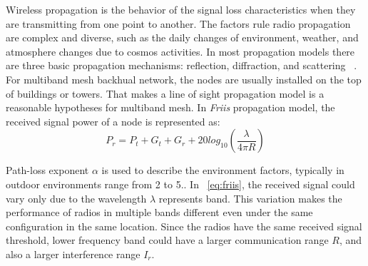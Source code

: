 Wireless propagation is the behavior of the signal loss characteristics when they are transmitting from one point to another.
The factors rule radio propagation are complex and diverse, 
such as the daily changes of environment, weather, and atmosphere changes due to cosmos activities. 
In most propagation models there are three basic propagation mechanisms: reflection, diffraction, and scattering ~\cite{andersen1995propagation}.
For multiband mesh backhual network, the nodes are usually installed on the top of buildings or towers. That makes a line of sight propagation model is a reasonable hypotheses for multiband mesh.
In \emph{Friis} propagation model, the received signal power of a node is represented as: 
\begin{equation}
\label{eq:friis}
P_r=P_t+G_t+G_r+20log_{10}(\frac{\lambda}{4\pi R})
\end{equation}

Path-loss exponent \emph{$\alpha$} is used to describe the environment factors, typically in outdoor environments range from 2 to 5.\cite{camp2006measurement}. 
In ~\ref{eq:friis}, the received signal could vary only due to the wavelength $\lambda$ represents band. 
This variation makes the performance of radios in multiple bands different even under the same configuration in the same location. Since the radios have the same received signal threshold, lower frequency band could have a larger communication range $R$, and also a larger interference range $I_r$.




